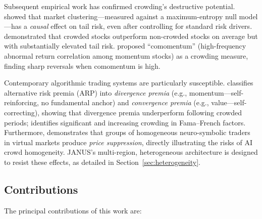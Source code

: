 \documentclass[12pt, a4paper]{article}
\begin{document}
Subsequent empirical work has confirmed crowding's destructive potential.
\citet{vankralingen2021crowded} showed that market clustering---measured against a maximum-entropy null model---has a \textit{causal} effect on tail risk, even after controlling for standard risk drivers.
\citet{brown2022crowded} demonstrated that crowded stocks outperform non-crowded stocks on average but with substantially elevated tail risk.
\citet{lou2022comomentum} proposed ``comomentum'' (high-frequency abnormal return correlation among momentum stocks) as a crowding measure, finding sharp reversals when comomentum is high.

Contemporary algorithmic trading systems are particularly susceptible. \citet{baltas2019arp} classifies alternative risk premia (ARP) into \textit{divergence premia} (e.g., momentum---self-reinforcing, no fundamental anchor) and \textit{convergence premia} (e.g., value---self-correcting), showing that divergence premia underperform following crowded periods; \citet{volpati2020zooming} identifies significant and increasing crowding in Fama--French factors. Furthermore, \citet{stillman2024neurosymbolic} demonstrates that groups of homogeneous neuro-symbolic traders in virtual markets produce \textit{price suppression}, directly illustrating the risks of AI crowd homogeneity. JANUS's multi-region, heterogeneous architecture is designed to resist these effects, as detailed in Section~\ref{sec:heterogeneity}.

\subsection{Contributions}
\label{sec:contributions}

The principal contributions of this work are:
\end{document}
